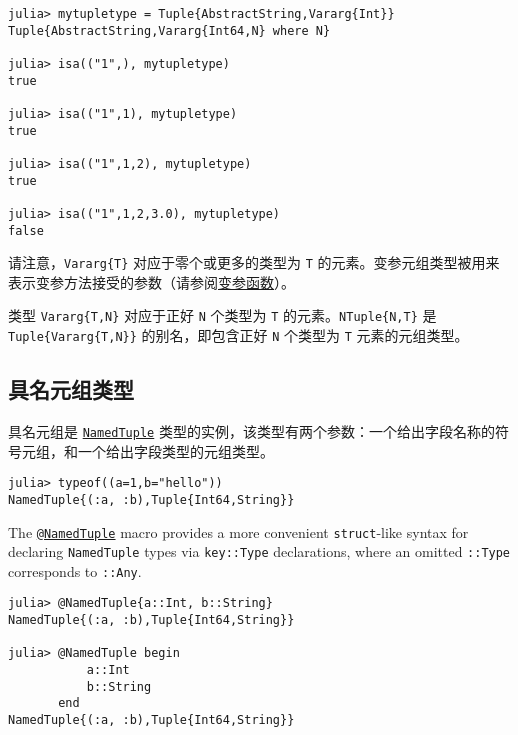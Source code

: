 \begin{verbatim}
julia> mytupletype = Tuple{AbstractString,Vararg{Int}}
Tuple{AbstractString,Vararg{Int64,N} where N}

julia> isa(("1",), mytupletype)
true

julia> isa(("1",1), mytupletype)
true

julia> isa(("1",1,2), mytupletype)
true

julia> isa(("1",1,2,3.0), mytupletype)
false
\end{verbatim}



请注意，\texttt{Vararg\{T\}} 对应于零个或更多的类型为 \texttt{T} 的元素。变参元组类型被用来表示变参方法接受的参数（请参阅\hyperlink{9965084594348935329}{变参函数}）。



类型 \texttt{Vararg\{T,N\}} 对应于正好 \texttt{N} 个类型为 \texttt{T} 的元素。\texttt{NTuple\{N,T\}} 是 \texttt{Tuple\{Vararg\{T,N\}\}} 的别名，即包含正好 \texttt{N} 个类型为 \texttt{T} 元素的元组类型。



\hypertarget{6997324644254770141}{}


\subsection{具名元组类型}



具名元组是 \hyperlink{3845731488275720657}{\texttt{NamedTuple}} 类型的实例，该类型有两个参数：一个给出字段名称的符号元组，和一个给出字段类型的元组类型。




\begin{verbatim}
julia> typeof((a=1,b="hello"))
NamedTuple{(:a, :b),Tuple{Int64,String}}
\end{verbatim}



The \href{@ref}{\texttt{@NamedTuple}} macro provides a more convenient \texttt{struct}-like syntax for declaring \texttt{NamedTuple} types via \texttt{key::Type} declarations, where an omitted \texttt{::Type} corresponds to \texttt{::Any}.




\begin{verbatim}
julia> @NamedTuple{a::Int, b::String}
NamedTuple{(:a, :b),Tuple{Int64,String}}

julia> @NamedTuple begin
           a::Int
           b::String
       end
NamedTuple{(:a, :b),Tuple{Int64,String}}
\end{verbatim}



